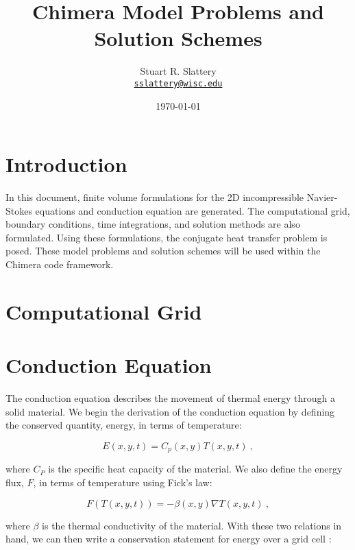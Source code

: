 \documentclass[letterpaper,12pt]{article}
\author{Stuart R. Slattery
\\ \href{mailto:sslattery@wisc.edu}{\texttt{sslattery@wisc.edu}}
}
\date{\today}
\title{Chimera Model Problems and Solution Schemes}
\begin{document}
\maketitle

\section{Introduction}
In this document, finite volume formulations for the 2D incompressible
Navier-Stokes equations and conduction equation are generated. The
computational grid, boundary conditions, time integrations, and
solution methods are also formulated. Using these formulations, the
conjugate heat transfer problem is posed. These model problems and
solution schemes will be used within the Chimera code framework.

\section{Computational Grid}

\section{Conduction Equation}
The conduction equation describes the movement of thermal energy
through a solid material. We begin the derivation of the conduction
equation by defining the conserved quantity, energy, in terms of
temperature:

\begin{equation}
  E(x,y,t) = C_p(x,y) T(x,y,t)\:,
  \label{eq:conduction_energy}
\end{equation}

where $C_P$ is the specific heat capacity of the material. We also
define the energy flux, $F$, in terms of temperature using Fick's law:

\begin{equation}
  F(T(x,y,t)) = -\beta(x,y) \nabla T(x,y,t)\:,
  \label{eq:conduction_ficks_law}
\end{equation}

where $\beta$ is the thermal conductivity of the material. With these
two relations in hand, we can then write a conservation statement for
energy over a grid cell \cite{leveque_2002}:
\end{document}
